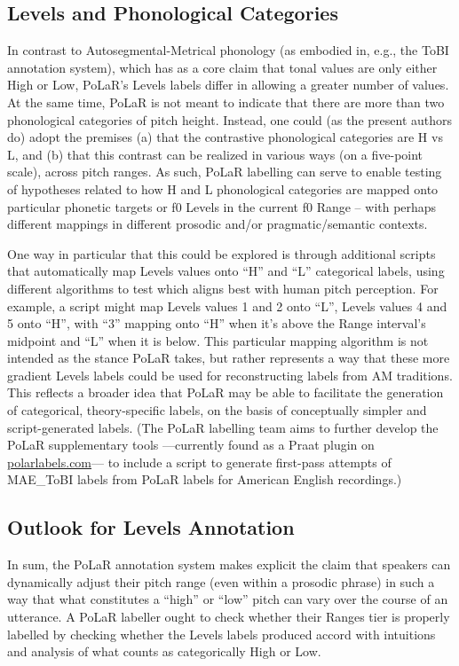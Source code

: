 \documentclass[11pt, twoside]{memoir}
\begin{document}
\subsection{Levels and Phonological Categories}\label{sec:levels-and-phonological-categories}
In contrast to Autosegmental-Metrical phonology (as embodied in, e.g., the ToBI annotation system), which has as a core claim that tonal values are only either High or Low, PoLaR’s Levels labels differ in allowing a greater number of values. At the same time, PoLaR is not meant to indicate that there are more than two phonological categories of pitch height. Instead, one could (as the present authors do) adopt the premises (a) that the contrastive phonological categories are H vs L, and (b) that this contrast can be realized in various ways (on a five-point scale), across pitch ranges. As such, PoLaR labelling can serve to enable testing of hypotheses related to how H and L phonological categories are mapped onto particular phonetic targets or f0 Levels in the current f0 Range – with perhaps different mappings in different prosodic and/or pragmatic\slash semantic contexts.

One way in particular that this could be explored is through additional scripts that automatically map Levels values onto “H” and “L” categorical labels, using different algorithms to test which aligns best with human pitch perception. For example, a script might map Levels values 1 and 2 onto “L”, Levels values 4 and 5 onto “H”, with “3” mapping onto “H” when it’s above the Range interval’s midpoint and “L” when it is below. This particular mapping algorithm is not intended as the stance PoLaR takes, but rather represents a way that these more gradient Levels labels could be used for reconstructing labels from AM traditions. This reflects a broader idea that PoLaR may be able to facilitate the generation of categorical, theory-specific labels, on the basis of conceptually simpler and script-generated labels. (The PoLaR labelling team aims to further develop the PoLaR supplementary tools —currently found as a Praat plugin on \href{https://www.polarlabels.com}{polarlabels.com}— to include a script to generate first-pass attempts of MAE\_ToBI labels from PoLaR labels for American English recordings.)


\subsection{Outlook for Levels Annotation}\label{sec:outlook-for-levels-annotation}
In sum, the PoLaR annotation system makes explicit the claim that speakers can dynamically adjust their pitch range (even within a prosodic phrase) in such a way that what constitutes a “high” or “low” pitch can vary over the course of an utterance. A PoLaR labeller ought to check whether their Ranges tier is properly labelled by checking whether the Levels labels produced accord with intuitions and analysis of what counts as categorically High or Low. 
\end{document}
